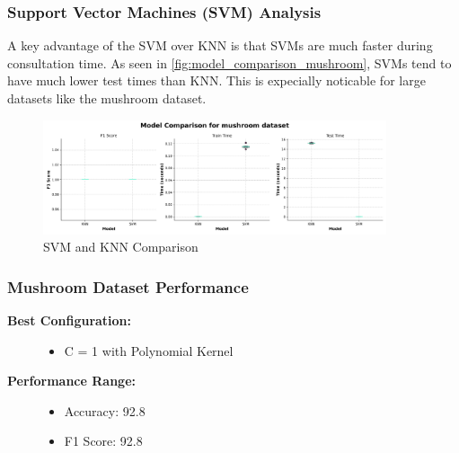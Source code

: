 \subsubsection{Support Vector Machines (SVM) Analysis}
\label{subsubsec:discussion-svm}


A key advantage of the SVM over KNN is that SVMs are much faster during consultation time. As seen in \autoref{fig:model_comparison_mushroom},
SVMs tend to have much lower test times than KNN. This is expecially noticable for large datasets like the mushroom dataset.

\begin{figure}
    \centering
    \includegraphics[width=0.9\textwidth]{figures/model_comparison_mushroom.png}
    \caption{SVM and KNN Comparison}
    \label{fig:model_comparison_mushroom}
\end{figure}

\subsubsection{Mushroom Dataset Performance}



\begin{description}
    \item[\textbf{Best Configuration:}]\leavevmode
        \begin{itemize}
            \item C = 1 with Polynomial Kernel
        \end{itemize}
    
    \item[\textbf{Performance Range:}]\leavevmode
        \begin{itemize}
            \item Accuracy: 92.8%
            \item F1 Score: 92.8%
        \end{itemize}
\end{description}

